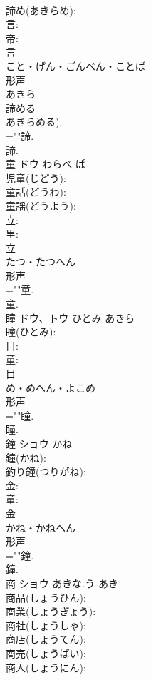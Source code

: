 \documentclass[8pt]{extreport}
\begin{document}
\begin{CJK}{UTF8}{min}
\\	諦め(あきらめ): 
\\	言: 
\\	帝: 
\\	言	
\\	こと・げん・ごんべん・ことば	
\\	形声 
\\	あきら 
\\	諦める 
\\	あきらめる).	
\\	=""諦.
\\	諦.
\\	童	ドウ	わらべ	ぱ	
\\	児童(じどう): 
\\	童話(どうわ): 
\\	童謡(どうよう): 
\\	立: 
\\	里: 
\\	立	
\\	たつ・たつへん	
\\	形声 
\\	=""童.
\\	童.
\\	瞳	ドウ、トウ	ひとみ	あきら	
\\	瞳(ひとみ): 
\\	目: 
\\	童: 
\\	目	
\\	め・めへん・よこめ	
\\	形声 
\\	=""瞳.
\\	瞳.
\\	鐘	ショウ	かね		
\\	鐘(かね): 
\\	釣り鐘(つりがね): 
\\	金: 
\\	童: 
\\	金	
\\	かね・かねへん	
\\	形声 
\\	=""鐘.
\\	鐘.
\\	商	ショウ	あきな.う	あき	
\\	商品(しょうひん): 
\\	商業(しょうぎょう): 
\\	商社(しょうしゃ): 
\\	商店(しょうてん): 
\\	商売(しょうばい): 
\\	商人(しょうにん): 

\end{CJK}
\end{document}
